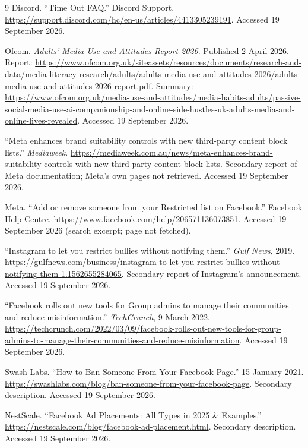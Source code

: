 \documentclass[11pt]{article}
\theoremstyle{definition}
\theoremstyle{remark}
\begin{document}
{\sloppy
\begin{thebibliography}{9}
 Discord. ``Time Out FAQ.'' Discord Support. \url{https://support.discord.com/hc/en-us/articles/4413305239191}. Accessed 19 September 2026.

 Ofcom. \emph{Adults' Media Use and Attitudes Report 2026}. Published 2 April 2026. Report: \url{https://www.ofcom.org.uk/siteassets/resources/documents/research-and-data/media-literacy-research/adults/adults-media-use-and-attitudes-2026/adults-media-use-and-attitudes-2026-report.pdf}. Summary: \url{https://www.ofcom.org.uk/media-use-and-attitudes/media-habits-adults/passive-social-media-use-ai-companionship-and-online-side-hustles-uk-adults-media-and-online-lives-revealed}. Accessed 19 September 2026.

 ``Meta enhances brand suitability controls with new third-party content block lists.'' \emph{Mediaweek}. \url{https://mediaweek.com.au/news/meta-enhances-brand-suitability-controls-with-new-third-party-content-block-lists}. Secondary report of Meta documentation; Meta's own pages not retrieved. Accessed 19 September 2026.

 Meta. ``Add or remove someone from your Restricted list on Facebook.'' Facebook Help Centre. \url{https://www.facebook.com/help/206571136073851}. Accessed 19 September 2026 (search excerpt; page not fetched).

 ``Instagram to let you restrict bullies without notifying them.'' \emph{Gulf News}, 2019. \url{https://gulfnews.com/business/instagram-to-let-you-restrict-bullies-without-notifying-them-1.1562655284065}. Secondary report of Instagram's announcement. Accessed 19 September 2026.

 ``Facebook rolls out new tools for Group admins to manage their communities and reduce misinformation.'' \emph{TechCrunch}, 9 March 2022. \url{https://techcrunch.com/2022/03/09/facebook-rolls-out-new-tools-for-group-admins-to-manage-their-communities-and-reduce-misinformation}. Accessed 19 September 2026.

 Swash Labs. ``How to Ban Someone From Your Facebook Page.'' 15 January 2021. \url{https://swashlabs.com/blog/ban-someone-from-your-facebook-page}. Secondary description. Accessed 19 September 2026.

 NestScale. ``Facebook Ad Placements: All Types in 2025 \& Examples.'' \url{https://nestscale.com/blog/facebook-ad-placement.html}. Secondary description. Accessed 19 September 2026.


\end{thebibliography}}
\end{document}
